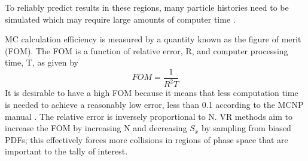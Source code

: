 To reliably predict results in these regions, many particle
histories need to be simulated which may require large amounts of computer time
\cite{haghighat_wagner_2003}.

MC calculation efficiency is measured by a quantity known as the figure of merit
(FOM).  The FOM is a function of relative error, R, and computer processing
time, T, 
as given by
\begin{equation} \label{eq:3}
		FOM = \frac{1}{{{R^2}T}}
\end{equation}
It is desirable to have a high FOM because it means that less computation time is needed to achieve
a reasonably low error, less than 0.1 according to the MCNP manual
\cite{mcnp_manual}. 
The relative error is inversely proportional to N.
VR methods
aim to increase the FOM by increasing N and decreasing $S_{\overline{x}}$ by sampling from biased PDFs; this effectively
forces more collisions in regions of phase space that are
important to the tally of interest. 
